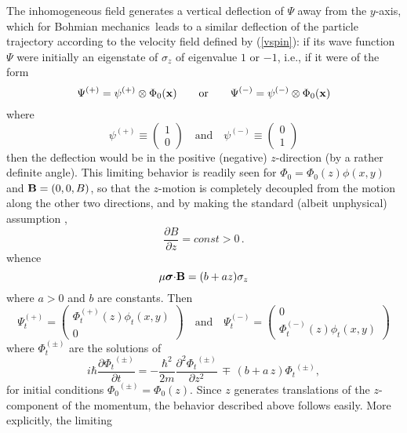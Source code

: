 \documentclass[12pt]{article}
\newcommand{\eq}[1]{(\ref{#1})}
\newcommand{\BM}{Bohmian mechanics}
\newcommand{\wf}{wave function}
\begin{document}
The inhomogeneous field generates a vertical deflection of $\Psi$ away
{}from the $y$-axis, which for \BM\ leads to a similar deflection of
the particle trajectory according to the velocity field defined by
\eq{vspin}: if its \wf\ $\Psi$ were initially an eigenstate of
$\sigma_z$ of eigenvalue $1$ or $-1$, i.e., if it were of the form
$$
\Psi^{(+)}=\psi^{(+)}\otimes\Phi_0 ({\bf x})\qquad\text{or}\qquad
\Psi^{(-)}=\psi^{(-)}\otimes\Phi_0 ({\bf x})
$$
where
\begin{equation}
\psi^{(+)} \equiv \left(\begin{array}{c} 1\\  0
\end{array} \right) \quad \mbox{and} \quad
\psi^{(-)} \equiv \left(\begin{array}{c} 0\\  1
\end{array} \right)
\label{eq:spinbasis}
\end{equation}
then the deflection would be in the positive (negative) $z$-direction
(by a rather definite angle).  This limiting behavior is readily seen
for $\Phi_0 = \Phi_0(z)\phi(x,y)$ and ${\bf B}=(0,0,B)$, so that the
$z$-motion is completely decoupled {}from the motion along the other
two directions, and by making the standard (albeit unphysical)
assumption \cite{Boe79}, \cite{Boh51}
   \begin{equation}
\label{consg}
\frac{\partial B}{\partial z} = const > 0\,.
\end{equation}
whence
$$
\mu\boldsymbol{\sigma}{\bf \cdot B}=( b+ az) \sigma_{z}
$$
where $a>0$ and $b$ are constants.  Then
$$
\Psi^{(+)}_{t} = \left(\begin{array}{c}
     \Phi^{(+)}_{t}(z)\phi_{t}(x,y)\\ 0
\end{array} \right) \quad \mbox{and} \quad
\Psi^{(-)}_{t} = \left(\begin{array}{c} 0\\
     \Phi^{(-)}_{t}(z)\phi_{t}(x,y)
\end{array} \right)
$$
where $\Phi^{(\pm)}_{t}$ are the solutions of
\begin{equation}
i\hbar\frac{\partial {\Phi_t}^{(\pm)}}{\partial t}=
-\frac{\hbar^2}{2m} \frac{\partial^2 {\Phi_t}^{(\pm)} }{\partial
z^2}\, \mp \, (b + a\,z){\Phi_t}^{(\pm)},
\label{eq:SGequ}
\end{equation}
for initial conditions ${\Phi_0}^{(\pm)}=\Phi_0(z)$.  Since $z$
generates translations of the $z$-component of the momentum, the
behavior described above follows easily. More explicitly, the limiting
\end{document}
